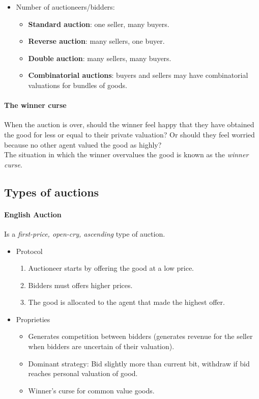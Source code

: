 \documentclass[10pt,a4paper]{article}
\begin{document}
\begin{itemize}
\item Number of auctioneers/bidders:

	\begin{itemize}
	\item \textbf{Standard auction}: one seller, many buyers.
	\item \textbf{Reverse auction}: many sellers, one buyer.
	\item \textbf{Double auction}: many sellers, many buyers.
	\item \textbf{Combinatorial auctions}: buyers and sellers may have combinatorial valuations for bundles of goods.

	\end{itemize}

\end{itemize}


\paragraph{The winner curse}
When the auction is over, should the winner feel happy that they have obtained the good for less or equal to their private valuation? Or should they feel worried because no other agent valued the good as highly?\\
The situation in which the winner overvalues the good is known as the \textit{winner curse}.


\subsection{Types of auctions}


\paragraph{English Auction}
Is a \textit{first-price, open-cry, ascending} type of auction. 

\begin{itemize}
\item Protocol
\begin{enumerate}
\item Auctioneer starts by offering the good at a low price.
\item Bidders must offers higher prices.
\item The good is allocated to the agent that made the highest offer.
\end{enumerate}

\item Proprieties
\begin{itemize}
\item Generates competition between bidders (generates revenue for the seller when bidders are uncertain of their valuation).
\item  Dominant strategy: Bid slightly more than current bit, withdraw if bid reaches personal valuation of good.
\item Winner’s curse for common value goods.
\end{itemize}
\end{itemize}
\end{document}
